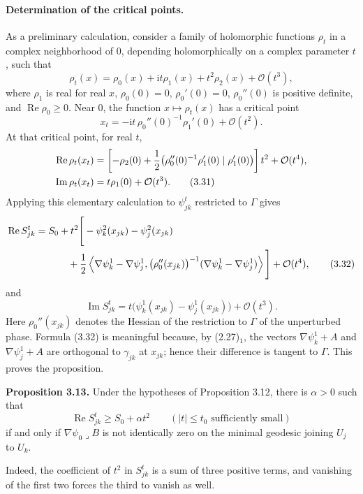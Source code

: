 \documentclass[11pt]{article}
\newcommand{\Ree}{\operatorname{Re}}
\newcommand{\Imm}{\operatorname{Im}}
\newcommand{\OO}{\mathcal O}
\newcommand{\ii}{\mathrm{i}}
\begin{document}
\paragraph{Determination of the critical points.}
As a preliminary calculation, consider a family of holomorphic functions $\rho_t$ in a complex neighborhood of $0$, depending holomorphically on a complex parameter $t$, such that
\[
\rho_t(x)=\rho_0(x)+\ii t\rho_1(x)+t^2\rho_2(x)+\OO(t^3),
\]
where $\rho_1$ is real for real $x$, $\rho_0(0)=0$, $\rho_0'(0)=0$, $\rho_0''(0)$ is positive definite, and $\Ree\rho_0\ge0$. Near $0$, the function $x\mapsto\rho_t(x)$ has a critical point
\begin{equation}
x_t=-\ii t\,\rho_0''(0)^{-1}\rho_1'(0)+\OO(t^2).
\tag{3.30}
\end{equation}
At that critical point, for real $t$,
\begin{align}
\Ree\rho_t(x_t)
&=\left[-\rho_2(0)
+\frac12\bigl(\rho_0''(0)^{-1}\rho_1'(0)\mid\rho_1'(0)\bigr)\right]t^2
+\OO(t^4),\notag\\
\Imm\rho_t(x_t)&=t\rho_1(0)+\OO(t^3).
\tag{3.31}
\end{align}
Applying this elementary calculation to $\psi_{jk}^t$ restricted to $\Gamma$ gives
\begin{align}
\Ree S_{jk}^t
={}&S_0+t^2\Bigg[-\psi_k^2(x_{jk})-\psi_j^2(x_{jk})\notag\\
&\qquad +\frac12\left\langle
\nabla\psi_k^1-\nabla\psi_j^1,
\bigl(\rho_0''(x_{jk})\bigr)^{-1}
(\nabla\psi_k^1-\nabla\psi_j^1)
\right\rangle\Bigg]
+\OO(t^4),
\tag{3.32}
\end{align}
and
\begin{equation}
\Imm S_{jk}^t
=t\bigl(\psi_k^1(x_{jk})-\psi_j^1(x_{jk})\bigr)+\OO(t^3).
\tag{3.33}
\end{equation}
Here $\rho_0''(x_{jk})$ denotes the Hessian of the restriction to $\Gamma$ of the unperturbed phase. Formula (3.32) is meaningful because, by (2.27)$_1$, the vectors $\nabla\psi_k^1+A$ and $\nabla\psi_j^1+A$ are orthogonal to $\gamma_{jk}$ at $x_{jk}$; hence their difference is tangent to $\Gamma$.
This proves the proposition.

\medskip
\noindent\textbf{Proposition 3.13.}
Under the hypotheses of Proposition 3.12, there is $\alpha>0$ such that
\[
\Ree S_{jk}^t\ge S_0+\alpha t^2
\qquad (|t|\le t_0\text{ sufficiently small})
\]
if and only if $\nabla\psi_0\mathbin{\lrcorner}B$ is not identically zero on the minimal geodesic joining $U_j$ to $U_k$.

Indeed, the coefficient of $t^2$ in $S_{jk}^t$ is a sum of three positive terms, and vanishing of the first two forces the third to vanish as well.
\end{document}
